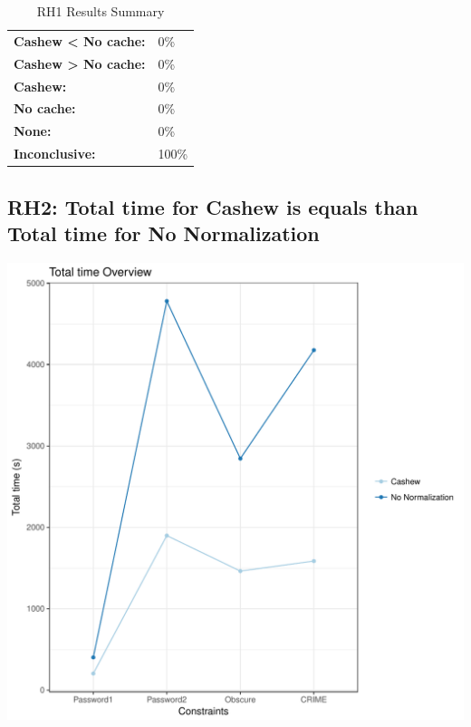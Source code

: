 \documentclass{article}\usepackage[]{graphicx}\usepackage[]{color}
\makeatletter
\def\maxwidth{ %
  \ifdim\Gin@nat@width>\linewidth
    \linewidth
  \else
    \Gin@nat@width
  \fi
}
\newenvironment{knitrout}{}{} %
\makeatother
\begin{document}
	\begin{table}[H]
	\centering
	\caption{RH1 Results Summary}
	\begin{tabular}{ll}
	\textbf{Cashew \textless{} No cache:}& 0\% \\
	\textbf{Cashew \textgreater{} No cache:}& 0\%\\
	\textbf{Cashew:} & 0\%\\
	\textbf{No cache:} & 0\%\\
	\textbf{None:}& 0\%\\
	\textbf{Inconclusive:}& 100\%
			
	
	\end{tabular}
	\end{table}
	
	
	



\subsection{RH2: Total time for Cashew is equals than Total time for No Normalization}


 
\begin{knitrout}
\color{fgcolor}
\includegraphics[width=\maxwidth]{figure/overview_RH2-1} 

\end{knitrout}
 	
\end{document}
